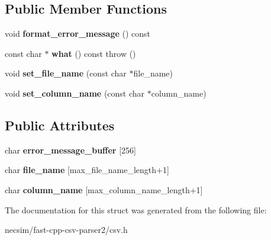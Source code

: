 \subsection*{Public Member Functions}
\begin{DoxyCompactItemize}
\item 
void {\bfseries format\+\_\+error\+\_\+message} () const \hypertarget{structio_1_1error_1_1extra__column__in__header_a9cc12589f136ed7f9fc40802b9185d79}{}\label{structio_1_1error_1_1extra__column__in__header_a9cc12589f136ed7f9fc40802b9185d79}

\item 
const char $\ast$ {\bfseries what} () const   throw ()\hypertarget{structio_1_1error_1_1base_ad99d4a2459e51ce2c24707569c4a0df6}{}\label{structio_1_1error_1_1base_ad99d4a2459e51ce2c24707569c4a0df6}

\item 
void {\bfseries set\+\_\+file\+\_\+name} (const char $\ast$file\+\_\+name)\hypertarget{structio_1_1error_1_1with__file__name_ae765de62778c989d4658b4efe2995390}{}\label{structio_1_1error_1_1with__file__name_ae765de62778c989d4658b4efe2995390}

\item 
void {\bfseries set\+\_\+column\+\_\+name} (const char $\ast$column\+\_\+name)\hypertarget{structio_1_1error_1_1with__column__name_a2a8144d3591a4bb618368ca7261befef}{}\label{structio_1_1error_1_1with__column__name_a2a8144d3591a4bb618368ca7261befef}

\end{DoxyCompactItemize}
\subsection*{Public Attributes}
\begin{DoxyCompactItemize}
\item 
char {\bfseries error\+\_\+message\+\_\+buffer} \mbox{[}256\mbox{]}\hypertarget{structio_1_1error_1_1base_a8e38f86a7afea1f0c6e6cac0c548d6f2}{}\label{structio_1_1error_1_1base_a8e38f86a7afea1f0c6e6cac0c548d6f2}

\item 
char {\bfseries file\+\_\+name} \mbox{[}max\+\_\+file\+\_\+name\+\_\+length+1\mbox{]}\hypertarget{structio_1_1error_1_1with__file__name_ac957d5590a8b95517b74eb5bf373a424}{}\label{structio_1_1error_1_1with__file__name_ac957d5590a8b95517b74eb5bf373a424}

\item 
char {\bfseries column\+\_\+name} \mbox{[}max\+\_\+column\+\_\+name\+\_\+length+1\mbox{]}\hypertarget{structio_1_1error_1_1with__column__name_af40ba00f1f035d363b099baf1f724323}{}\label{structio_1_1error_1_1with__column__name_af40ba00f1f035d363b099baf1f724323}

\end{DoxyCompactItemize}


The documentation for this struct was generated from the following file\+:\begin{DoxyCompactItemize}
\item 
necsim/fast-\/cpp-\/csv-\/parser2/csv.\+h\end{DoxyCompactItemize}
